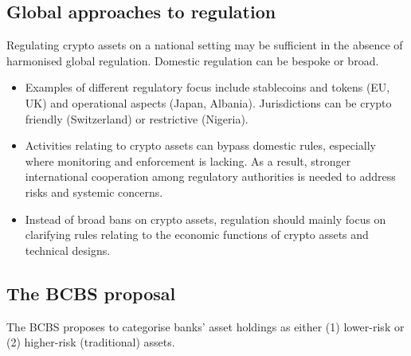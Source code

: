 
\subsection*{Global approaches to regulation}

Regulating crypto assets on a national setting may be sufficient in the absence of harmonised
global regulation. Domestic regulation can be bespoke or broad.

\begin{itemize}
\item Examples of different regulatory focus include stablecoins and tokens (EU, UK) and
operational aspects (Japan, Albania). Jurisdictions can be crypto friendly (Switzerland) or
restrictive (Nigeria).
\item Activities relating to crypto assets can bypass domestic rules, especially where
monitoring and enforcement is lacking. As a result, stronger international cooperation among
regulatory authorities is needed to address risks and systemic concerns.
\item Instead of broad bans on crypto assets, regulation should mainly focus on clarifying
rules relating to the economic functions of crypto assets and technical designs.
\end{itemize}

\subsection*{The BCBS proposal}

The BCBS proposes to categorise banks' asset holdings as either (1) lower-risk or (2)
higher-risk (traditional) assets.

